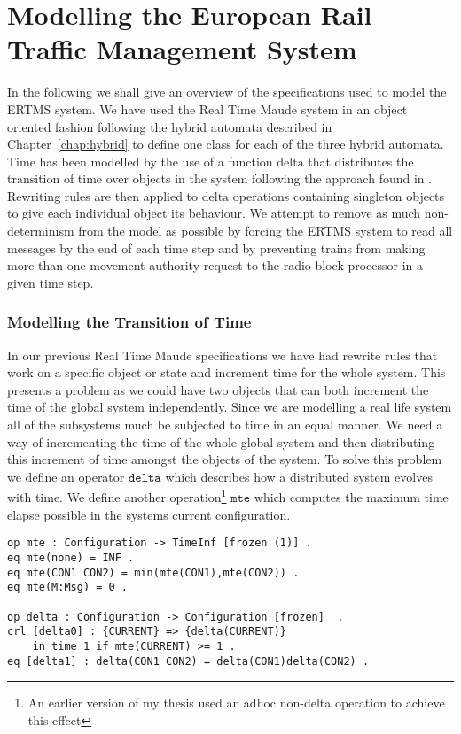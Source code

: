 \section{Modelling the European Rail Traffic Management System}
In the following we shall give an overview of the specifications used to model the ERTMS system. We have used the Real Time Maude system in an object oriented fashion following the hybrid automata described in Chapter~\ref{chap:hybrid} to define one class for each of the three hybrid automata. Time has been modelled by the use of a function $\mathrm{delta}$ that distributes the transition of time over objects in the system following the approach found in \cite{PO07b}. Rewriting rules are then applied to $\mathrm{delta}$ operations containing singleton objects to give each individual object its behaviour. We attempt to remove as much non-determinism from the model as possible by forcing the ERTMS system to read all messages by the end of each time step and by preventing trains from making more than one movement authority request to the radio block processor in a given time step.


\subsubsection*{Modelling the Transition of Time} \label{sec:maudetimemodelling}
In our previous Real Time Maude specifications we have had rewrite rules that work on a specific object or state and increment time for the whole system. This presents a problem as we could have two objects that can both increment the time of the global system independently.  Since we are modelling a real life system all of the subsystems much be subjected to time in an equal manner. We need a way of incrementing the time of the whole global system and then distributing this increment of time amongst the objects of the system. To solve this problem we define an operator $\texttt{delta}$ \cite{PO07b} which describes how a distributed system evolves with time. We define another operation\footnote{An earlier version of my thesis used an adhoc non-delta operation to achieve this effect} $\texttt{mte}$ which computes the maximum time elapse possible in the systems current configuration.

\begin{lstlisting}[caption = The delta and mte operations, label = code:delta]
op mte : Configuration -> TimeInf [frozen (1)] .
eq mte(none) = INF .
eq mte(CON1 CON2) = min(mte(CON1),mte(CON2)) .
eq mte(M:Msg) = 0 .

op delta : Configuration -> Configuration [frozen]  . 
crl [delta0] : {CURRENT} => {delta(CURRENT)} 
    in time 1 if mte(CURRENT) >= 1 .
eq [delta1] : delta(CON1 CON2) = delta(CON1)delta(CON2) .
\end{lstlisting}

